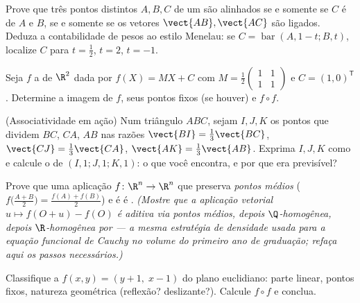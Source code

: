 \begin{exercise}[$\star$]\label{exo:b2:affine:2}
Prove que três pontos distintos $A, B, C$ de um  são
alinhados se e somente se $C$ é  de $A$ e $B$, se e somente se os vetores
$\vect{AB}, \vect{AC}$ são ligados. Deduza a contabilidade de pesos ao estilo
Menelau: se $C = \operatorname{bar}(A, 1 - t; B, t)$, localize
$C$ para $t = \frac12$, $t = 2$, $t = -1$.
\end{exercise}

\begin{exercise}[$\star$]\label{exo:b2:affine:3}
Seja $f$ a  de $\R^2$ dada por $f(X) = MX + C$ com
$M = \frac12\begin{pmatrix} 1 & 1\\ 1 & 1\end{pmatrix}$ e $C =
(1, 0)^{\mathsf T}$. Determine a imagem de $f$, seus pontos fixos
(se houver) e $f \circ f$.
\end{exercise}

\begin{exercise}[$\star\star$]\label{exo:b2:affine:4}
(Associatividade em ação) Num triângulo $ABC$, sejam $I, J, K$ os pontos que dividem
$BC$, $CA$, $AB$ nas razões $\vect{BI} = \frac13\vect{BC}$,
$\vect{CJ} = \frac13\vect{CA}$, $\vect{AK} = \frac13\vect{AB}$.
Exprima $I, J, K$ como  e calcule o  de
$(I,1;J,1;K,1)$: o que você encontra, e por que era previsível?
\end{exercise}

\begin{exercise}[$\star\star$]\label{exo:b2:affine:5}
Prove que uma aplicação $f \colon \R^n \to \R^n$ que preserva \emph{pontos médios}
($f\bigl(\frac{A+B}{2}\bigr) = \frac{f(A) + f(B)}{2}$) e é
\emph{} é . \emph{(Mostre que a aplicação vetorial $u \mapsto
f(O + u) - f(O)$ é aditiva via pontos médios, depois
$\Q$-homogênea, depois $\R$-homogênea por  ---
a mesma estratégia de densidade usada para a equação funcional de Cauchy no
volume do primeiro ano de graduação; refaça aqui os passos necessários.)}
\end{exercise}

\begin{exercise}[$\star\star$]\label{exo:b2:affine:6}
Classifique a  $f(x, y) = (y + 1,\; x - 1)$ do
plano euclidiano: parte linear, pontos fixos, natureza geométrica
(reflexão? deslizante?). Calcule $f \circ f$ e conclua.
\end{exercise}

